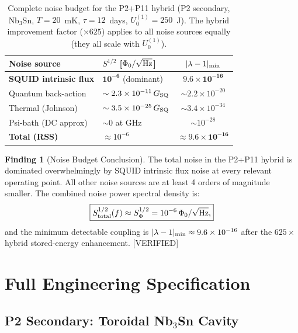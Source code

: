 \documentclass[11pt,twocolumn]{article}
\newcommand{\lam}{\lambda}
\newcommand{\ee}[1]{\times 10^{#1}}
\theoremstyle{definition}
\newtheorem{finding}[theorem]{Finding}
\theoremstyle{remark}
\begin{document}
\begin{table}[H]
\caption{Complete noise budget for the P2+P11 hybrid (P2 secondary,
Nb$_3$Sn, $T = 20$~mK, $\tau = 12$~days, $U_0^{(1)} = 250$~J).
The hybrid improvement factor ($\times625$) applies to all noise
sources equally (they all scale with $U_0^{(1)}$).}
\label{tab:noise_budget}
\begin{tabular}{@{}lp{2.8cm}c@{}}
\toprule
Noise source & $S^{1/2}$ [$\Phi_0/\sqrt{\rm Hz}$]
& $|\lam-1|_{\rm min}$ \\
\midrule
\textbf{SQUID intrinsic flux} & $\mathbf{10^{-6}}$ (dominant) & $\mathbf{9.6\ee{-16}}$ \\
Quantum back-action & $\sim 2.3\ee{-11}\,G_{\rm SQ}$ & $\sim 2.2\ee{-20}$ \\
Thermal (Johnson) & $\sim 3.5\ee{-25}\,G_{\rm SQ}$ & $\sim 3.4\ee{-34}$ \\
Psi-bath (DC approx) & $\sim 0$ at GHz & $\sim 10^{-28}$ \\
\midrule
\textbf{Total (RSS)} & $\approx 10^{-6}$ & $\approx \mathbf{9.6\ee{-16}}$ \\
\bottomrule
\end{tabular}
\end{table}

\begin{finding}[Noise Budget Conclusion]
\label{find:noise}
The total noise in the P2+P11 hybrid is dominated overwhelmingly by SQUID
intrinsic flux noise at every relevant operating point. All other noise
sources are at least 4 orders of magnitude smaller. The combined noise
power spectral density is:
\begin{equation}
\boxed{
S_{\rm total}^{1/2}(f) \approx S_\Phi^{1/2} = 10^{-6}\,\Phi_0/\sqrt{\rm Hz},
}
\label{eq:total_noise}
\end{equation}
and the minimum detectable coupling is $|\lam-1|_{\rm min} \approx 9.6\ee{-16}$
after the $625\times$ hybrid stored-energy enhancement. [VERIFIED]
\end{finding}

\section{Full Engineering Specification}
\label{sec:engineering}

\subsection{P2 Secondary: Toroidal Nb$_3$Sn Cavity}
\label{sec:p2_secondary_spec}
\end{document}
